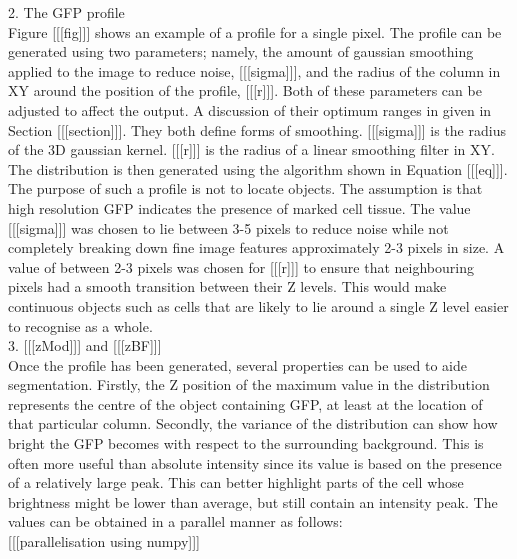 \documentclass[12pt]{article}
\begin{document}
2. The GFP profile \\

Figure [[[fig]]] shows an example of a profile for a single pixel. The profile can be generated using two parameters; namely, the amount of gaussian smoothing applied to the image to reduce noise, [[[sigma]]], and the radius of the column in XY around the position of the profile, [[[r]]]. Both of these parameters can be adjusted to affect the output. A discussion of their optimum ranges in given in Section [[[section]]]. They both define forms of smoothing. [[[sigma]]] is the radius of the 3D gaussian kernel. [[[r]]] is the radius of a linear smoothing filter in XY. The distribution is then generated using the algorithm shown in Equation [[[eq]]]. The purpose of such a profile is not to locate objects. The assumption is that high resolution GFP indicates the presence of marked cell tissue. The value [[[sigma]]] was chosen to lie between 3-5 pixels to reduce noise while not completely breaking down fine image features approximately 2-3 pixels in size. A value of between 2-3 pixels was chosen for [[[r]]] to ensure that neighbouring pixels had a smooth transition between their Z levels. This would make continuous objects such as cells that are likely to lie around a single Z level easier to recognise as a whole. \\

3. [[[zMod]]] and [[[zBF]]] \\

Once the profile has been generated, several properties can be used to aide segmentation. Firstly, the Z position of the maximum value in the distribution represents the centre of the object containing GFP, at least at the location of that particular column. Secondly, the variance of the distribution can show how bright the GFP becomes with respect to the surrounding background. This is often more useful than absolute intensity since its value is based on the presence of a relatively large peak. This can better highlight parts of the cell whose brightness might be lower than average, but still contain an intensity peak. The values can be obtained in a parallel manner as follows: \\

[[[parallelisation using numpy]]] \\
\end{document}
